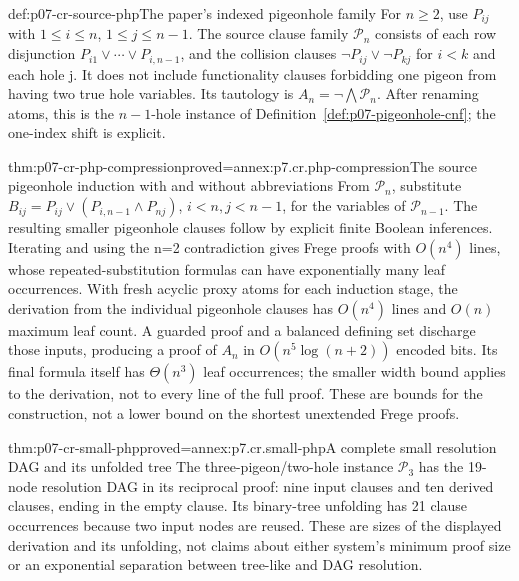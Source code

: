 \begin{hbdefinition}{def:p07-cr-source-php}{The paper's indexed pigeonhole family}
For \(n\geq2\), use \(P_{ij}\) with \(1\leq i\leq n\),
\(1\leq j\leq n-1\). The source clause family
\(\mathcal P_n\) consists of each row disjunction
\(P_{i1}\lor\cdots\lor P_{i,n-1}\), and the collision clauses
\(\neg P_{ij}\lor\neg P_{kj}\) for \(i<k\) and each hole j.
It does not include functionality clauses forbidding one pigeon
from having two true hole variables. Its tautology is
\(A_n=\neg\bigwedge\mathcal P_n\).
After renaming atoms, this is the \(n-1\)-hole instance of
Definition~\ref{def:p07-pigeonhole-cnf}; the one-index shift is explicit.
\end{hbdefinition}

\begin{hbtheorem}{thm:p07-cr-php-compression}{proved=annex:p7.cr.php-compression}{The source pigeonhole induction with and without abbreviations}
From \(\mathcal P_n\), substitute
\(B_{ij}=P_{ij}\lor(P_{i,n-1}\land P_{nj})\),
\(i<n,j<n-1\), for the variables of \(\mathcal P_{n-1}\).
The resulting smaller pigeonhole clauses follow by explicit finite
Boolean inferences. Iterating and using the n=2 contradiction gives
Frege proofs with \(O(n^4)\) lines, whose repeated-substitution
formulas can have exponentially many leaf occurrences. With fresh
acyclic proxy atoms for each induction stage, the derivation from
the individual pigeonhole clauses has \(O(n^4)\) lines and
\(O(n)\) maximum leaf count. A guarded proof and a balanced defining
set discharge those inputs, producing a proof of \(A_n\) in
\(O(n^5\log(n+2))\) encoded bits. Its final formula itself has
\(\Theta(n^3)\) leaf occurrences; the smaller width bound applies
to the derivation, not to every line of the full proof. These are
bounds for the construction, not a
lower bound on the shortest unextended Frege proofs.
\end{hbtheorem}

\begin{hbtheorem}{thm:p07-cr-small-php}{proved=annex:p7.cr.small-php}{A complete small resolution DAG and its unfolded tree}
The three-pigeon/two-hole instance \(\mathcal P_3\) has the
19-node resolution DAG in its reciprocal proof: nine input clauses
and ten derived clauses, ending in the empty clause. Its binary-tree
unfolding has 21 clause occurrences because two input nodes are
reused. These are sizes of the displayed derivation and its unfolding,
not claims about either system's minimum proof size or an exponential
separation between tree-like and DAG resolution.
\end{hbtheorem}

